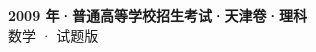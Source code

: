 \documentclass[zihao=-4, a4paper]{ctexart}
\begin{document}
\begin{center}
  {\Large\bfseries 2009 年·普通高等学校招生考试·天津卷·理科}\\[4pt]
  {\large 数学 · 试题版}
\end{center}
\medskip
{}

\end{document}
